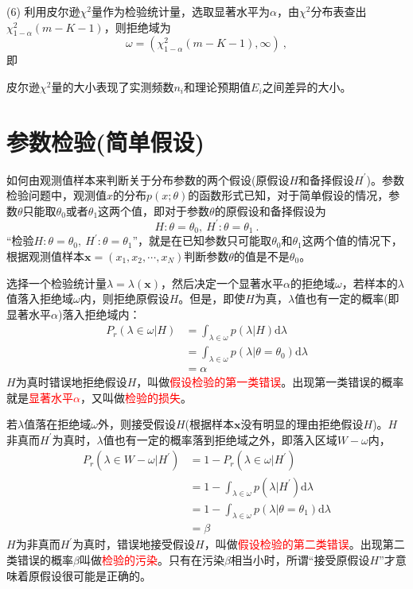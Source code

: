 \documentclass[12pt,a4paper]{article}
\renewcommand{\vec}[1]{\boldsymbol{#1}}
\newcommand{\dif}{\mathrm{d}}
\begin{document}
(6) 利用皮尔逊$\chi^2$量作为检验统计量，选取显著水平为$\alpha$，由$\chi^2$分布表查出$\chi^2_{1-\alpha}(m-K-1)$，则拒绝域为
\begin{equation*}
\omega = (\chi^2_{1-\alpha}(m-K-1), \infty) ~,
\end{equation*}
即




皮尔逊$\chi^2$量的大小表现了实测频数$n_i$和理论预期值$E_i$之间差异的大小。



\section{参数检验(简单假设)}
如何由观测值样本来判断关于分布参数的两个假设(原假设$H$和备择假设$H^\prime$)。参数检验问题中，观测值$x$的分布$p(x;\theta)$的函数形式已知，对于简单假设的情况，参数$\theta$只能取$\theta_0$或者$\theta_1$这两个值，即对于参数$\theta$的原假设和备择假设为
\begin{equation}
H: \theta = \theta_0, ~ H^\prime: \theta = \theta_1 ~.
\end{equation}
“检验$H: \theta = \theta_0, ~ H^\prime: \theta = \theta_1$”，就是在已知参数只可能取$\theta_0$和$\theta_1$这两个值的情况下，根据观测值样本$\vec{x} = (x_1, x_2, \cdots, x_N)$判断参数$\theta$的值是不是$\theta_0$。


选择一个检验统计量$\lambda=\lambda(\vec{x})$，然后决定一个显著水平$\alpha$的拒绝域$\omega$，若样本的$\lambda$值落入拒绝域$\omega$内，则拒绝原假设$H$。但是，即使$H$为真，$\lambda$值也有一定的概率(即显著水平$\alpha$)落入拒绝域内：
\begin{align}
\nonumber P_r(\lambda \in \omega | H) &= \int_{\lambda\in \omega} p(\lambda |H) \dif \lambda \\
\nonumber &= \int_{\lambda\in \omega} p(\lambda |\theta = \theta_0) \dif \lambda \\
&= \alpha
\end{align}
$H$为真时错误地拒绝假设$H$，叫做\textcolor{red}{假设检验的第一类错误}。出现第一类错误的概率就是\textcolor{red}{显著水平$\alpha$}，又叫做\textcolor{red}{检验的损失}。

若$\lambda$值落在拒绝域$\omega$外，则接受假设$H$(根据样本$\vec{x}$没有明显的理由拒绝假设$H$)。$H$非真而$H^\prime$为真时，$\lambda$值也有一定的概率落到拒绝域之外，即落入区域$W-\omega$内，
\begin{align}
\nonumber P_r(\lambda \in W-\omega | H^\prime) &= 1-P_r(\lambda \in \omega | H^\prime) \\
\nonumber &= 1- \int_{\lambda\in \omega} p(\lambda |H^\prime) \dif \lambda \\
\nonumber &= 1- \int_{\lambda\in \omega} p(\lambda |\theta = \theta_1) \dif \lambda \\
&= \beta
\end{align}
$H$为非真而$H^\prime$为真时，错误地接受假设$H$，叫做\textcolor{red}{假设检验的第二类错误}。出现第二类错误的概率$\beta$叫做\textcolor{red}{检验的污染}。只有在污染$\beta$相当小时，所谓“接受原假设$H$”才意味着原假设很可能是正确的。
\end{document}
